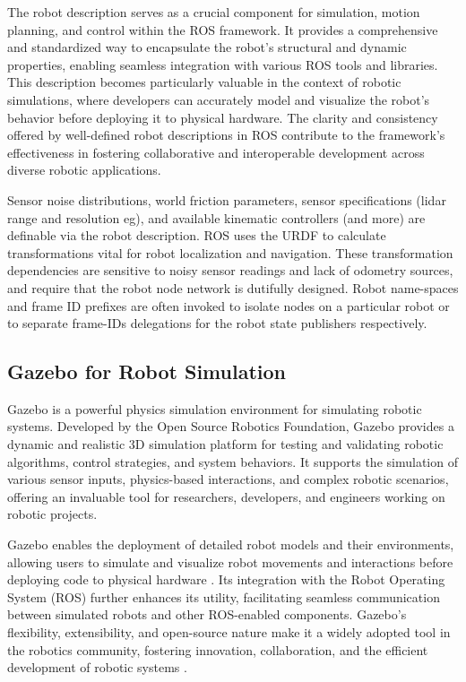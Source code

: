 \documentclass[conference]{IEEEtran}
\begin{document}
The robot description serves as a crucial component for simulation, motion planning, and control within the ROS framework. It provides a comprehensive and standardized way to encapsulate the robot's structural and dynamic properties, enabling seamless integration with various ROS tools and libraries. This description becomes particularly valuable in the context of robotic simulations, where developers can accurately model and visualize the robot's behavior before deploying it to physical hardware. The clarity and consistency offered by well-defined robot descriptions in ROS contribute to the framework's effectiveness in fostering collaborative and interoperable development across diverse robotic applications.

Sensor noise distributions, world friction parameters, sensor specifications (lidar range and resolution eg), and available kinematic controllers (and more) are definable via the robot description. ROS uses the URDF to calculate transformations vital for robot localization and navigation. These transformation dependencies are sensitive to noisy sensor readings and lack of odometry sources, and require that the robot node network is dutifully designed. Robot name-spaces and frame ID prefixes are often invoked to isolate nodes on a particular robot or to separate frame-IDs delegations for the robot state publishers respectively. 

\subsection{Gazebo for Robot Simulation}

Gazebo is a powerful physics simulation environment for simulating robotic systems. Developed by the Open Source Robotics Foundation, Gazebo provides a dynamic and realistic 3D simulation platform for testing and validating robotic algorithms, control strategies, and system behaviors. It supports the simulation of various sensor inputs, physics-based interactions, and complex robotic scenarios, offering an invaluable tool for researchers, developers, and engineers working on robotic projects. 

Gazebo enables the deployment of detailed robot models and their environments, allowing users to simulate and visualize robot movements and interactions before deploying code to physical hardware \cite{RN104}. Its integration with the Robot Operating System (ROS) further enhances its utility, facilitating seamless communication between simulated robots and other ROS-enabled components. Gazebo's flexibility, extensibility, and open-source nature make it a widely adopted tool in the robotics community, fostering innovation, collaboration, and the efficient development of robotic systems \cite{RN201}.
\end{document}
